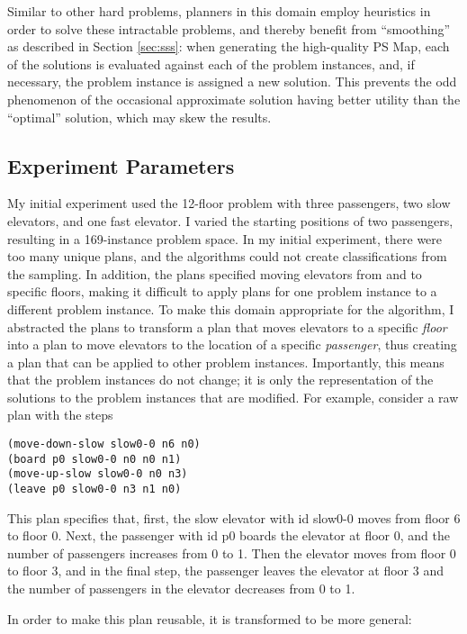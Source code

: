 Similar to other hard problems, planners in this domain employ heuristics in order to solve these intractable problems, and thereby benefit from ``smoothing'' as described in Section \ref{sec:sss}:  when generating the high-quality PS Map, each of the solutions is evaluated against each of the problem instances, and, if necessary, the problem instance is assigned a new solution.  This prevents the odd phenomenon of the occasional approximate solution having better utility than the ``optimal'' solution, which may skew the results.

\subsection{Experiment Parameters} My initial experiment used the 12-floor problem with three passengers, two slow elevators, and one fast elevator.  I varied the starting positions of two passengers, resulting in a 169-instance problem space.  In my initial experiment, there were too many unique plans, and the algorithms could not create classifications from the sampling. In addition, the plans specified moving elevators from and to specific floors, making it difficult to apply plans for one problem instance to a different problem instance.  To make this domain appropriate for the algorithm, I abstracted the plans to transform a plan that moves elevators to a specific \textit{floor} into a plan to move elevators to the location of a specific \textit{passenger}, thus creating a plan that can be applied to other problem instances. Importantly, this means that the problem instances do not change; it is only the representation of the solutions to the problem instances that are modified. For example, consider a raw plan with the steps

\begin{verbatim}
(move-down-slow slow0-0 n6 n0)
(board p0 slow0-0 n0 n0 n1)
(move-up-slow slow0-0 n0 n3)
(leave p0 slow0-0 n3 n1 n0)
\end{verbatim}

\noindent
This plan specifies that, first, the slow elevator with id slow0-0 moves from floor 6 to floor 0.  Next, the passenger with id p0 boards the elevator at floor 0, and the number of passengers increases from 0 to 1.  Then the elevator moves from floor 0 to floor 3, and in the final step, the passenger leaves the elevator at floor 3 and the number of passengers in the elevator decreases from 0 to 1.

In order to make this plan reusable, it is transformed to be  more general:

